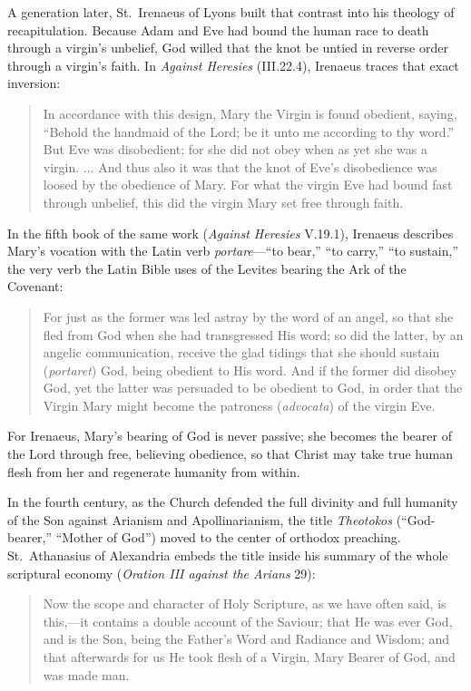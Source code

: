 A generation later, St.\ Irenaeus of Lyons built that contrast into his theology of recapitulation. Because Adam and Eve had bound the human race to death through a virgin's unbelief, God willed that the knot be untied in reverse order through a virgin's faith. In \textit{Against Heresies} (III.22.4), Irenaeus traces that exact inversion:

\begin{quote}\small
In accordance with this design, Mary the Virgin is found obedient, saying, ``Behold the handmaid of the Lord; be it unto me according to thy word.'' But Eve was disobedient; for she did not obey when as yet she was a virgin. ... And thus also it was that the knot of Eve's disobedience was loosed by the obedience of Mary. For what the virgin Eve had bound fast through unbelief, this did the virgin Mary set free through faith.
\end{quote}

In the fifth book of the same work (\textit{Against Heresies} V.19.1), Irenaeus describes Mary's vocation with the Latin verb \textit{portare}---``to bear,'' ``to carry,'' ``to sustain,'' the very verb the Latin Bible uses of the Levites bearing the Ark of the Covenant:

\begin{quote}\small
For just as the former was led astray by the word of an angel, so that she fled from God when she had transgressed His word; so did the latter, by an angelic communication, receive the glad tidings that she should sustain (\textit{portaret}) God, being obedient to His word. And if the former did disobey God, yet the latter was persuaded to be obedient to God, in order that the Virgin Mary might become the patroness (\textit{advocata}) of the virgin Eve.
\end{quote}

For Irenaeus, Mary's bearing of God is never passive; she becomes the bearer of the Lord through free, believing obedience, so that Christ may take true human flesh from her and regenerate humanity from within.

In the fourth century, as the Church defended the full divinity and full humanity of the Son against Arianism and Apollinarianism, the title \textit{Theotokos} (``God-bearer,'' ``Mother of God'') moved to the center of orthodox preaching. St.\ Athanasius of Alexandria embeds the title inside his summary of the whole scriptural economy (\textit{Oration III against the Arians} 29):

\begin{quote}\small
Now the scope and character of Holy Scripture, as we have often said, is this,---it contains a double account of the Saviour; that He was ever God, and is the Son, being the Father's Word and Radiance and Wisdom; and that afterwards for us He took flesh of a Virgin, Mary Bearer of God, and was made man.
\end{quote}

